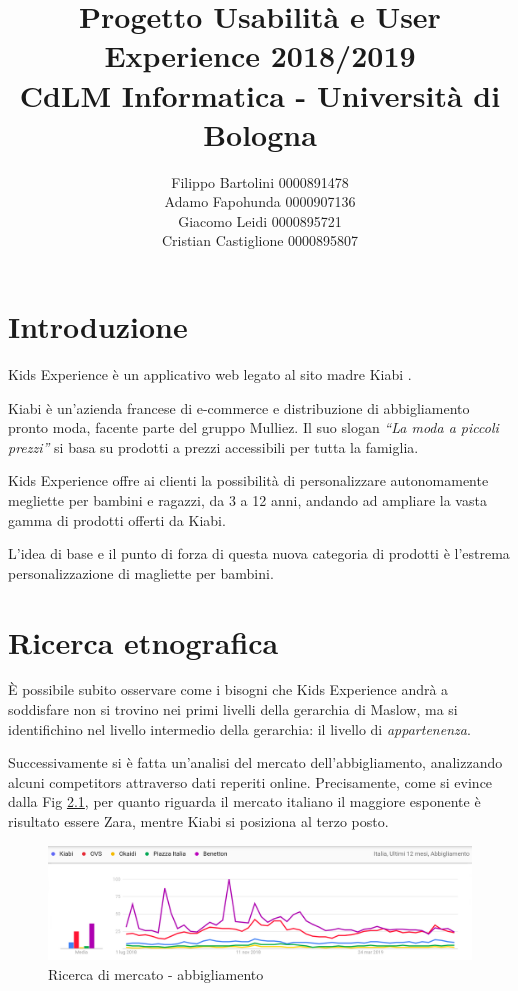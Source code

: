 \documentclass[12pt,italian,]{report}
\title{Progetto Usabilità e User Experience 2018/2019\\[0.8em]\large CdLM Informatica - Università di Bologna}
\author{Filippo Bartolini 0000891478 \\ Adamo Fapohunda 0000907136\\ Giacomo Leidi 0000895721 \\ Cristian Castiglione 0000895807}
\date{}
\begin{document}
\maketitle

{
\setcounter{tocdepth}{2}
\tableofcontents
}
\hypertarget{introduzione}{%
\chapter{Introduzione}\label{introduzione}}

Kids Experience è un applicativo web legato al sito madre Kiabi \cite{kiabi}.

Kiabi è un'azienda francese di e-commerce e distribuzione di
abbigliamento pronto moda, facente parte del gruppo Mulliez. Il suo
slogan \emph{``La moda a piccoli prezzi''} si basa su prodotti a prezzi
accessibili per tutta la famiglia.

Kids Experience offre ai clienti la possibilità di personalizzare
autonomamente megliette per bambini e ragazzi, da 3 a 12 anni, andando
ad ampliare la vasta gamma di prodotti offerti da Kiabi.

L'idea di base e il punto di forza di questa nuova categoria di prodotti è l'estrema personalizzazione di magliette per bambini.

\hypertarget{ricerca-etnografica}{%
\chapter{Ricerca etnografica}\label{ricerca-etnografica}}

È possibile subito osservare come i bisogni che Kids Experience andrà a
soddisfare non si trovino nei primi livelli della gerarchia di Maslow,
ma si identifichino nel livello intermedio della gerarchia: il livello
di \emph{appartenenza}.

Successivamente si è fatta un'analisi del mercato dell'abbigliamento,
analizzando alcuni competitors attraverso dati reperiti online.
Precisamente, come si evince dalla Fig \ref{abbigliamo_generico}, per quanto riguarda il
mercato italiano il maggiore esponente è risultato essere Zara, mentre Kiabi si
posiziona al terzo posto.

\begin{figure}[h]
\centering
\includegraphics{img/abbigliamento_generico.png}
\caption{Ricerca di mercato - abbigliamento}
\label{abbigliamo_generico}
\end{figure}
\end{document}
